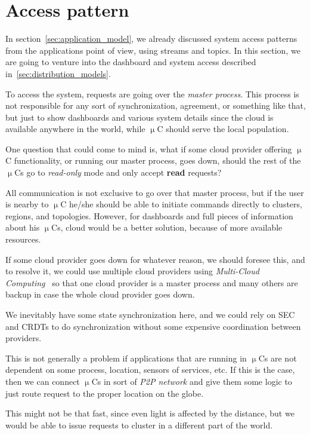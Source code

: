 \section{Access pattern}\label{sec:access_pattern}
%
In section~\ref{sec:application_model}, we already discussed system access patterns from the applications point of view, using streams and topics. In this section, we are going to venture into the dashboard and system access described in~\ref{sec:distribution_models}. 

To access the system, requests are going over the \textit{master process}. This process is not responsible for any sort of synchronization, agreement, or something like that, but just to show dashboards and various system details since the cloud is available anywhere in the world, while $\upmu$C should serve the local population. 

One question that could come to mind is, what if some cloud provider offering $\upmu$C functionality, or running our master process, goes down, should the rest of the $\upmu$Cs go to \textit{read-only} mode and only accept \textbf{read} requests?

All communication is not exclusive to go over that master process, but if the user is nearby to $\upmu$C he/she should be able to initiate commands directly to clusters, regions, and topologies. However, for dashboards and full pieces of information about his $\upmu$Cs, cloud would be a better solution, because of more available resources.

If some cloud provider goes down for whatever reason, we should foresee this, and to resolve it, we could use multiple cloud providers using \textit{Multi-Cloud Computing}~\cite{HongDSH19, Ardagna15} so that one cloud provider is a master process and many others are backup in case the whole cloud provider goes down.

We inevitably have some state synchronization here, and we could rely on SEC and CRDTs to do synchronization without some expensive coordination between providers.

This is not generally a problem if applications that are running in $\upmu$Cs are not dependent on some process, location, sensors of services, etc. If this is the case, then we can connect $\upmu$Cs in sort of \emph{P2P network} and give them some logic to just route request to the proper location on the globe. 

This might not be that fast, since even light is affected by the distance, but we would be able to issue requests to cluster in a different part of the world.
%
%
